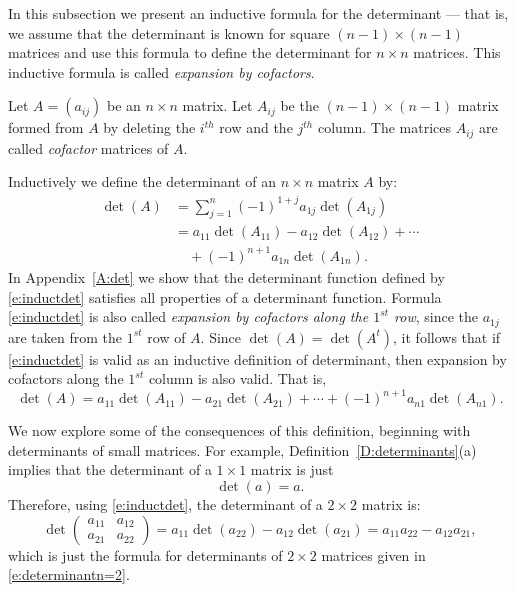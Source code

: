 \documentclass{ximera}
\begin{document}
In this subsection we present an inductive formula for the
determinant --- that is, we assume that the determinant is known
for square $(n-1)\times(n-1)$ matrices and use this formula to
define the determinant for $n\times n$ matrices.  This inductive formula
is called {\em expansion by cofactors\/}.
 
Let $A=(a_{ij})$ be an $n\times n$ matrix.  Let $A_{ij}$ be the
$(n-1)\times(n-1)$ matrix formed from $A$ by deleting the
$i^{th}$ row and the $j^{th}$ column.  The matrices $A_{ij}$ are
called {\em cofactor\/}  matrices of $A$.  

Inductively we define the determinant of an $n\times n$ matrix $A$ by:
\begin{align}
\det(A) & = \sum^n_{j=1} (-1)^{1+j}a_{1j}\det(A_{1j}) \nonumber
\\  & = 
      a_{11}\det(A_{11})-a_{12}\det(A_{12})+\cdots \nonumber\\
  & \quad +(-1)^{n+1}a_{1n}\det(A_{1n}).
    \label{e:inductdet}
\end{align} 
In Appendix~\ref{A:det} we show that the determinant function defined by 
\eqref{e:inductdet} satisfies all properties of a determinant function.
Formula \eqref{e:inductdet} is also called {\em expansion by cofactors along 
the $1^{st}$ row\/}, since the $a_{1j}$ are taken from the $1^{st}$ row 
of $A$.  Since $\det(A)=\det(A^t)$, it follows that if \eqref{e:inductdet} is 
valid as an inductive definition of determinant, then expansion by cofactors 
along the $1^{st}$ column is also valid.  That is,
\begin{equation}  \label{e:inductdetc}
\det(A) = 
a_{11}\det(A_{11})-a_{21}\det(A_{21})+\cdots+(-1)^{n+1}a_{n1}\det(A_{n1}).
\end{equation} 

We now explore some of the consequences of this definition, beginning 
with determinants of small matrices.  For example, 
Definition~\ref{D:determinants}(a) implies that the determinant of a 
$1\times 1$ matrix is just
\[
\det(a) = a.
\]
Therefore, using \eqref{e:inductdet}, the determinant of a $2\times
2$ matrix is:
\[
\det\left(\begin{array}{cc} a_{11} & a_{12}\\a_{21} & a_{22}
\end{array}\right) = a_{11}\det(a_{22}) - a_{12}\det(a_{21}) =
a_{11}a_{22} - a_{12}a_{21},
\]
which is just the formula for determinants of $2\times 2$
matrices given in \eqref{e:determinantn=2}. 
 
\end{document}
